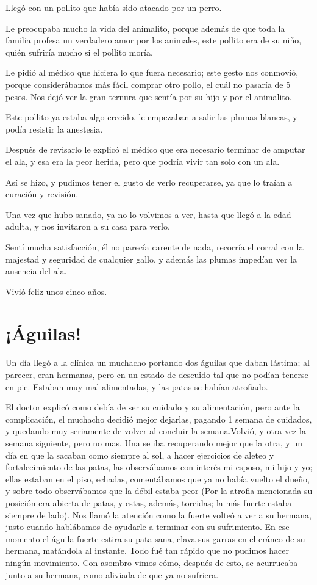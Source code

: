 \documentclass[letterpaper, 12pt]{book}
\begin{document}
Llegó con un pollito que había sido atacado por un perro.

Le preocupaba mucho la vida del animalito, porque además de que toda la familia profesa un verdadero amor por los animales, este pollito era de su niño, quién sufriría mucho si el pollito moría. 

Le pidió al médico que hiciera lo que fuera necesario; este gesto nos conmovió, porque considerábamos más fácil comprar otro pollo, el cuál no pasaría de 5 pesos. Nos dejó ver la gran ternura que sentía por su hijo y por el animalito.

Este pollito ya estaba algo crecido, le empezaban a salir las plumas blancas, y podía resistir la anestesia. 

Después de revisarlo le explicó el médico que era necesario terminar de amputar el ala, y esa era la peor herida, pero que podría vivir tan solo con un ala.

Así se hizo, y pudimos tener el gusto de verlo recuperarse, ya que lo traían a curación y revisión. 

Una vez que hubo sanado, ya no lo volvimos a ver, hasta que llegó a la edad adulta, y nos invitaron a su casa para verlo.

Sentí mucha satisfacción, él no parecía carente de nada, recorría el corral con la majestad y seguridad de cualquier gallo, y además las plumas impedían ver la ausencia del ala.

Vivió feliz unos cinco años.


\chapter{¡Águilas!}
Un día llegó a la clínica un muchacho portando dos águilas que daban lástima; al parecer, eran hermanas, pero en un estado de descuido tal que no podían tenerse en pie. Estaban muy mal alimentadas, y las patas se habían atrofiado.

El doctor explicó como debía de ser su cuidado y su alimentación, pero ante la complicación, el muchacho decidió mejor dejarlas, pagando 1 semana de cuidados, y quedando muy seriamente de volver al concluir la semana.Volvió, y otra vez la semana siguiente, pero no mas. Una se iba recuperando mejor que la otra, y un día en que la sacaban como siempre al sol, a hacer ejercicios de aleteo y fortalecimiento de las patas, las observábamos con interés mi esposo, mi hijo y yo; ellas estaban en el piso, echadas, comentábamos que ya no había vuelto el dueño, y sobre todo observábamos que la débil estaba peor (Por la atrofia mencionada su posición era abierta de patas, y estas, además, torcidas; la más fuerte estaba siempre de lado). Nos llamó la  atención como la fuerte volteó a ver a su hermana, justo cuando hablábamos de ayudarle a terminar con su sufrimiento. En ese momento el águila fuerte estira su pata sana, clava sus garras en el cráneo de su hermana, matándola al instante. Todo fué tan rápido que no pudimos hacer ningún movimiento. Con asombro vimos cómo, después de esto, se acurrucaba junto a su hermana, como aliviada de que ya no sufriera.
\end{document}

